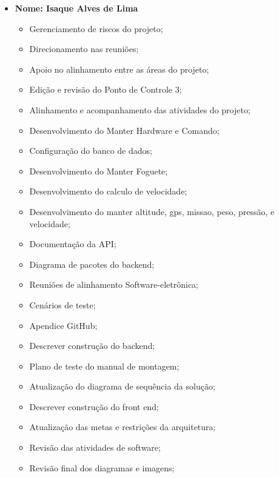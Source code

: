 \begin{itemize}
    
    \item \textbf{Nome: Isaque Alves de Lima}
    \begin{itemize}
    \item Gerenciamento de riscos do projeto;
    \item Direcionamento nas reuniões;
    \item Apoio no alinhamento entre as áreas do projeto;
    \item Edição e revisão do Ponto de Controle 3;
    \item Alinhamento e acompanhamento das atividades do projeto;
    \item Desenvolvimento do Manter Hardware e Comando;
    \item Configuração do banco de dados;
    \item Desenvolvimento do Manter Foguete;
    \item Desenvolvimento do calculo de velocidade;
    \item Desenvolvimento do manter altitude, gps, missao, peso, pressão, e velocidade;
    \item Documentação da API;
    \item Diagrama de pacotes do backend;
    \item Reuniões de alinhamento Software-eletrônica;
    \item Cenários de teste;
    \item Apendice GitHub;
    \item Descrever construção do backend;
    \item Plano de teste do manual de montagem;
    \item Atualização do diagrama de sequência da solução;
    \item Descrever construção do front end;
    \item Atualização das metas e restrições da arquitetura;
    \item Revisão das atividades de software;
    \item Revisão final dos diagramas e imagens;
    \end{itemize}
    

\end{itemize}
